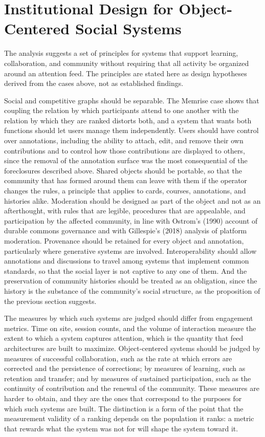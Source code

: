 \documentclass[11pt]{article}
\theoremstyle{remark}
\begin{document}
\section{Institutional Design for Object-Centered Social Systems}
\label{sec:design}

The analysis suggests a set of principles for systems that support learning, collaboration, and community without requiring that all activity be organized around an attention feed. The principles are stated here as design hypotheses derived from the cases above, not as established findings.

Social and competitive graphs should be separable. The Memrise case shows that coupling the relation by which participants attend to one another with the relation by which they are ranked distorts both, and a system that wants both functions should let users manage them independently. Users should have control over annotations, including the ability to attach, edit, and remove their own contributions and to control how those contributions are displayed to others, since the removal of the annotation surface was the most consequential of the foreclosures described above. Shared objects should be portable, so that the community that has formed around them can leave with them if the operator changes the rules, a principle that applies to cards, courses, annotations, and histories alike. Moderation should be designed as part of the object and not as an afterthought, with rules that are legible, procedures that are appealable, and participation by the affected community, in line with Ostrom's (1990) account of durable commons governance and with Gillespie's (2018) analysis of platform moderation. Provenance should be retained for every object and annotation, particularly where generative systems are involved. Interoperability should allow annotations and discussions to travel among systems that implement common standards, so that the social layer is not captive to any one of them. And the preservation of community histories should be treated as an obligation, since the history is the substance of the community's social structure, as the proposition of the previous section suggests.

The measures by which such systems are judged should differ from engagement metrics. Time on site, session counts, and the volume of interaction measure the extent to which a system captures attention, which is the quantity that feed architectures are built to maximize. Object-centered systems should be judged by measures of successful collaboration, such as the rate at which errors are corrected and the persistence of corrections; by measures of learning, such as retention and transfer; and by measures of sustained participation, such as the continuity of contribution and the renewal of the community. These measures are harder to obtain, and they are the ones that correspond to the purposes for which such systems are built. The distinction is a form of the point that the measurement validity of a ranking depends on the population it ranks: a metric that rewards what the system was not for will shape the system toward it.
\end{document}
